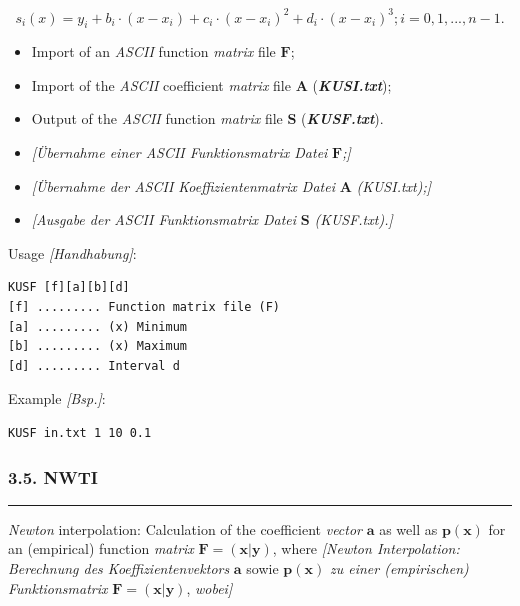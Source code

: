 \documentclass[
]{article}
\begin{document}
\[s_{i}(x) = y_{i} + b_{i} \cdot \left( x - x_{i} \right) + c_{i} \cdot \left( x - x_{i} \right)^{2} + d_{i} \cdot \left( x - x_{i} \right)^{3};i = 0,1,...,n - 1.\]

\begin{itemize}
\item
  Import of an \emph{ASCII} function \emph{matrix} file \(\mathbf{F}\);
\item
  Import of the \emph{ASCII} coefficient \emph{matrix} file
  \(\mathbf{A}\) (\textbf{\emph{KUSI.txt}});
\item
  Output of the \emph{ASCII} function \emph{matrix} file \(\mathbf{S}\)
  (\textbf{\emph{KUSF.txt}}).
\item
  \emph{{[}Übernahme einer ASCII Funktionsmatrix Datei}
  \(\mathbf{F}\)\emph{;{]}}
\item
  \emph{{[}Übernahme der ASCII Koeffizientenmatrix Datei} \(\mathbf{A}\)
  \emph{(KUSI.txt);{]}}
\item
  \emph{{[}Ausgabe der ASCII Funktionsmatrix Datei} \(\mathbf{S}\)
  \emph{(KUSF.txt).{]}}
\end{itemize}

Usage \emph{{[}Handhabung{]}}:

\begin{verbatim}
KUSF [f][a][b][d] 
[f] ......... Function matrix file (F)
[a] ......... (x) Minimum
[b] ......... (x) Maximum
[d] ......... Interval d
\end{verbatim}

Example \emph{{[}Bsp.{]}}:

\begin{verbatim}
KUSF in.txt 1 10 0.1
\end{verbatim}

\hypertarget{nwti}{%
\subsubsection{3.5. NWTI}\label{nwti}}

\begin{center}\rule{0.5\linewidth}{0.5pt}\end{center}

\emph{Newton} interpolation: Calculation of the coefficient
\emph{vector} \(\mathbf{a}\) as well as
\(\mathbf{p}\left( \mathbf{x} \right)\) for an (empirical) function
\emph{matrix} \(\mathbf{F =}\left( \mathbf{x|y} \right)\), where
\emph{{[}Newton Interpolation: Berechnung des Koeffizientenvektors}
\(\mathbf{a}\) sowie \(\mathbf{p}\left( \mathbf{x} \right)\) \emph{zu
einer (empirischen) Funktionsmatrix}
\(\mathbf{F =}\left( \mathbf{x|y} \right)\), \emph{wobei{]}}
\end{document}
